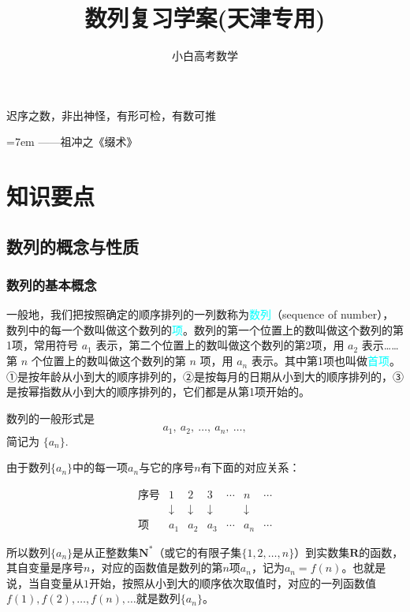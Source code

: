 \documentclass{article}
\title{数列复习学案(天津专用)}
\author{小白高考数学}
\date{}
\begin{document}
\maketitle

\vspace{30\baselineskip}
\begin{center}
迟序之数，非出神怪，有形可检，有数可推
\end{center}
\begin{flushright}
    \rightskip=7em 
——祖冲之《缀术》
\end{flushright}    
\newpage
\tableofcontents %
\newpage 

\section{知识要点}
\subsection{数列的概念与性质}
\subsubsection{数列的基本概念}
一般地，我们把按照确定的顺序排列的一列数称为\textcolor{cyan}{数列}（sequence of number），数列中的每一个数叫做这个数列的\textcolor{cyan}{项}。数列的第一个位置上的数叫做这个数列的第1项，常用符号 \(a_1\) 表示，第二个位置上的数叫做这个数列的第2项，用 \(a_2\) 表示……第 \(n\) 个位置上的数叫做这个数列的第 \(n\) 项，用 \(a_n\) 表示。其中第1项也叫做\textcolor{cyan}{首项}。①是按年龄从小到大的顺序排列的，②是按每月的日期从小到大的顺序排列的，③是按幂指数从小到大的顺序排列的，它们都是从第1项开始的。

数列的一般形式是
\[
a_1,\ a_2,\ \dots,\ a_n,\ \dots,
\]
简记为 \(\{a_n\}\).

由于数列$\{a_n\}$中的每一项$a_n$与它的序号$n$有下面的对应关系：

\[
\begin{array}{c*{6}{c}}
\text{序号} & 1 & 2 & 3 & \cdots & n & \cdots \\
           & \downarrow & \downarrow & \downarrow & & \downarrow & \\
\text{项}   & a_1 & a_2 & a_3 & \cdots & a_n & \cdots
\end{array}
\]

所以数列$\{a_n\}$是从正整数集$\mathbf{N}^*$（或它的有限子集$\{1,2,\dots,n\}$）到实数集$\mathbf{R}$的函数，其自变量是序号$n$，对应的函数值是数列的第$n$项$a_n$，记为$a_n = f(n)$。也就是说，当自变量从$1$开始，按照从小到大的顺序依次取值时，对应的一列函数值$f(1),f(2),\dots,f(n),\dots$就是数列$\{a_n\}$。
\end{document}
